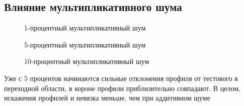 \documentclass[a4paper]{article}
\begin{document}
\subsection*{Влияние мультипликативного шума}
\begin{figure}[h!]
\caption{1-процентный мультипликативный шум}
\end{figure}
\begin{figure}[h!]
\caption{5-процентный мультипликативный шум}
\end{figure}
\begin{figure}[h!]
\caption{10-процентный мультипликативный шум}
\end{figure}
\hfill\break
\hfill\break
\hfill\break
\hfill\break
\hfill\break
\hfill\break
\hfill\break
\hfill\break
Уже с 5 процентов начинаются сильные отклонения профиля от тестового в переходной области, в короне профили приблизительно совпадают.
В целом, искажения профилей и невязка меньше, чем при аддитивном шуме
\end{document}
